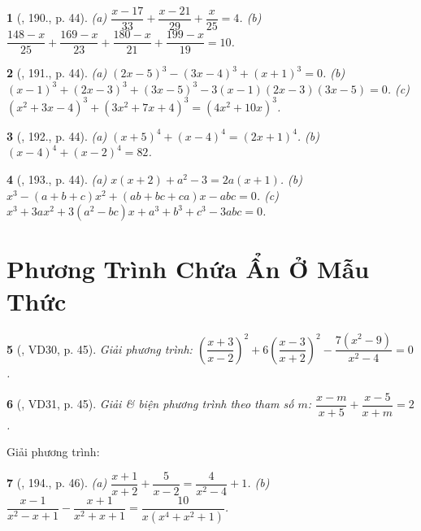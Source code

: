 \documentclass{article}
\newtheorem{baitoan}{}
\begin{document}
\begin{baitoan}[\cite{Tuyen_Toan_8}, 190., p. 44]
	(a) $\dfrac{x - 17}{33} + \dfrac{x - 21}{29} + \dfrac{x}{25} = 4$. (b) $\dfrac{148 - x}{25} + \dfrac{169 - x}{23} + \dfrac{180 - x}{21} + \dfrac{199 - x}{19} = 10$.
\end{baitoan}

\begin{baitoan}[\cite{Tuyen_Toan_8}, 191., p. 44]
	(a) $(2x - 5)^3 - (3x - 4)^3 + (x + 1)^3 = 0$. (b) $(x - 1)^3 + (2x - 3)^3 + (3x - 5)^3 - 3(x - 1)(2x - 3)(3x - 5) = 0$. (c) $(x^2 + 3x - 4)^3 + (3x^2 + 7x + 4)^3 = (4x^2 + 10x)^3$.
\end{baitoan}

\begin{baitoan}[\cite{Tuyen_Toan_8}, 192., p. 44]
	(a) $(x + 5)^4 + (x - 4)^4 = (2x + 1)^4$. (b) $(x - 4)^4 + (x - 2)^4 = 82$.
\end{baitoan}

\begin{baitoan}[\cite{Tuyen_Toan_8}, 193., p. 44]
	(a) $x(x + 2) + a^2 - 3 = 2a(x + 1)$. (b) $x^3 - (a + b + c)x^2 + (ab + bc + ca)x - abc = 0$. (c) $x^3 + 3ax^2 + 3(a^2 - bc)x + a^3 + b^3 + c^3 - 3abc = 0$.
\end{baitoan}


\section{Phương Trình Chứa Ẩn Ở Mẫu Thức}

\begin{baitoan}[\cite{Tuyen_Toan_8}, VD30, p. 45]
	Giải phương trình: $\left(\dfrac{x + 3}{x - 2}\right)^2 + 6\left(\dfrac{x - 3}{x + 2}\right)^2 - \dfrac{7(x^2 - 9)}{x^2 - 4} = 0$.
\end{baitoan}

\begin{baitoan}[\cite{Tuyen_Toan_8}, VD31, p. 45]
	Giải \& biện phương trình theo tham số $m$: $\dfrac{x - m}{x + 5} + \dfrac{x - 5}{x + m} = 2$.
\end{baitoan}
Giải phương trình:

\begin{baitoan}[\cite{Tuyen_Toan_8}, 194., p. 46]
	(a) $\dfrac{x + 1}{x + 2} + \dfrac{5}{x - 2} = \dfrac{4}{x^2 - 4} + 1$. (b) $\dfrac{x - 1}{x^2 - x + 1} - \dfrac{x + 1}{x^2 + x + 1} = \dfrac{10}{x(x^4 + x^2 + 1)}$.
\end{baitoan}
\end{document}
